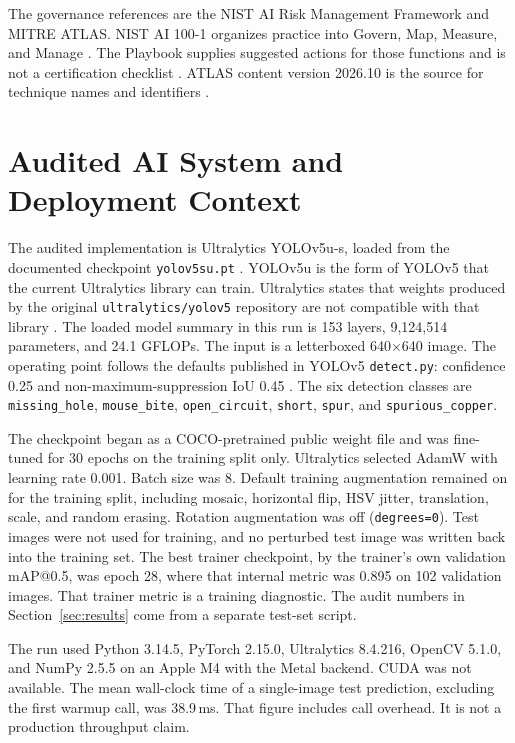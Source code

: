 \documentclass[conference]{IEEEtran}
\begin{document}
The governance references are the NIST AI Risk Management Framework and MITRE ATLAS. NIST AI 100-1 organizes practice into Govern, Map, Measure, and Manage \cite{nist2023airmf}. The Playbook supplies suggested actions for those functions and is not a certification checklist \cite{nist2023playbook}. ATLAS content version 2026.10 is the source for technique names and identifiers \cite{mitre2026atlas}.

\section{Audited AI System and Deployment Context}
\label{sec:system}
The audited implementation is Ultralytics YOLOv5u-s, loaded from the documented checkpoint \texttt{yolov5su.pt} \cite{ultralytics2026yolov5docs}. YOLOv5u is the form of YOLOv5 that the current Ultralytics library can train. Ultralytics states that weights produced by the original \texttt{ultralytics/yolov5} repository are not compatible with that library \cite{ultralytics2026yolov5docs}. The loaded model summary in this run is 153 layers, 9{,}124{,}514 parameters, and 24.1 GFLOPs. The input is a letterboxed 640$\times$640 image. The operating point follows the defaults published in YOLOv5 \texttt{detect.py}: confidence 0.25 and non-maximum-suppression IoU 0.45 \cite{jocher2020yolov5}. The six detection classes are \texttt{missing\_hole}, \texttt{mouse\_bite}, \texttt{open\_circuit}, \texttt{short}, \texttt{spur}, and \texttt{spurious\_copper}.

The checkpoint began as a COCO-pretrained public weight file and was fine-tuned for 30 epochs on the training split only. Ultralytics selected AdamW with learning rate 0.001. Batch size was 8. Default training augmentation remained on for the training split, including mosaic, horizontal flip, HSV jitter, translation, scale, and random erasing. Rotation augmentation was off (\texttt{degrees=0}). Test images were not used for training, and no perturbed test image was written back into the training set. The best trainer checkpoint, by the trainer's own validation mAP@0.5, was epoch 28, where that internal metric was 0.895 on 102 validation images. That trainer metric is a training diagnostic. The audit numbers in Section~\ref{sec:results} come from a separate test-set script.

The run used Python 3.14.5, PyTorch 2.15.0, Ultralytics 8.4.216, OpenCV 5.1.0, and NumPy 2.5.5 on an Apple M4 with the Metal backend. CUDA was not available. The mean wall-clock time of a single-image test prediction, excluding the first warmup call, was 38.9\,ms. That figure includes call overhead. It is not a production throughput claim.
\end{document}
